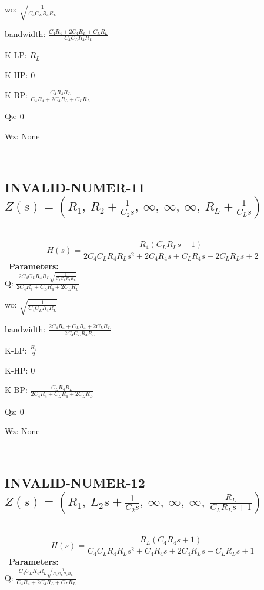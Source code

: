 \documentclass{article}
\begin{document}
wo: $\sqrt{\frac{1}{C_{4} C_{L} R_{4} R_{L}}}$\ 

bandwidth: $\frac{C_{4} R_{4} + 2 C_{4} R_{L} + C_{L} R_{L}}{C_{4} C_{L} R_{4} R_{L}}$\ 

K-LP: $R_{L}$\ 

K-HP: $0$\ 

K-BP: $\frac{C_{4} R_{4} R_{L}}{C_{4} R_{4} + 2 C_{4} R_{L} + C_{L} R_{L}}$\ 

Qz: $0$\ 

Wz: $\text{None}$\ 

\ 

\subsection{INVALID-NUMER-11 $Z(s) = \left( R_{1}, \  R_{2} + \frac{1}{C_{2} s}, \  \infty, \  \infty, \  \infty, \  R_{L} + \frac{1}{C_{L} s}\right)$ } \ 
\textbf{\[H(s) = \frac{R_{4} \left(C_{L} R_{L} s + 1\right)}{2 C_{4} C_{L} R_{4} R_{L} s^{2} + 2 C_{4} R_{4} s + C_{L} R_{4} s + 2 C_{L} R_{L} s + 2}\] } \ 
\textbf{Parameters:}\\ 

Q: $\frac{2 C_{4} C_{L} R_{4} R_{L} \sqrt{\frac{1}{C_{4} C_{L} R_{4} R_{L}}}}{2 C_{4} R_{4} + C_{L} R_{4} + 2 C_{L} R_{L}}$\ 

wo: $\sqrt{\frac{1}{C_{4} C_{L} R_{4} R_{L}}}$\ 

bandwidth: $\frac{2 C_{4} R_{4} + C_{L} R_{4} + 2 C_{L} R_{L}}{2 C_{4} C_{L} R_{4} R_{L}}$\ 

K-LP: $\frac{R_{4}}{2}$\ 

K-HP: $0$\ 

K-BP: $\frac{C_{L} R_{4} R_{L}}{2 C_{4} R_{4} + C_{L} R_{4} + 2 C_{L} R_{L}}$\ 

Qz: $0$\ 

Wz: $\text{None}$\ 

\ 

\subsection{INVALID-NUMER-12 $Z(s) = \left( R_{1}, \  L_{2} s + \frac{1}{C_{2} s}, \  \infty, \  \infty, \  \infty, \  \frac{R_{L}}{C_{L} R_{L} s + 1}\right)$ } \ 
\textbf{\[H(s) = \frac{R_{L} \left(C_{4} R_{4} s + 1\right)}{C_{4} C_{L} R_{4} R_{L} s^{2} + C_{4} R_{4} s + 2 C_{4} R_{L} s + C_{L} R_{L} s + 1}\] } \ 
\textbf{Parameters:}\\ 

Q: $\frac{C_{4} C_{L} R_{4} R_{L} \sqrt{\frac{1}{C_{4} C_{L} R_{4} R_{L}}}}{C_{4} R_{4} + 2 C_{4} R_{L} + C_{L} R_{L}}$\ 
\end{document}
